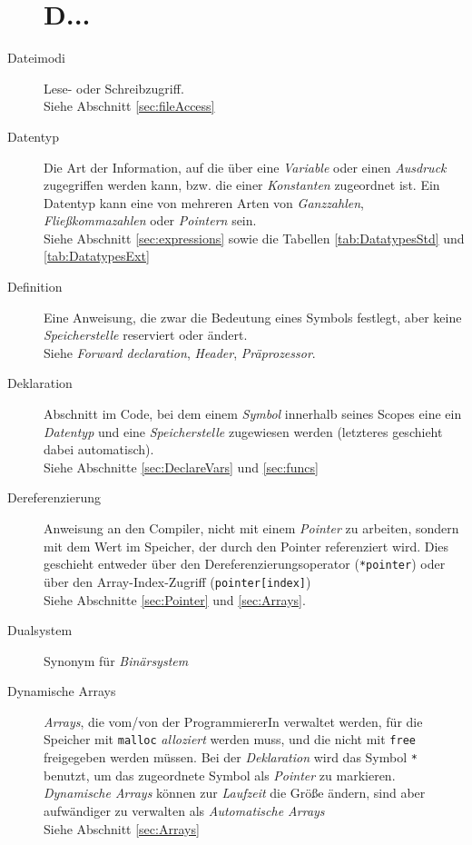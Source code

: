 \begin{appendices}
\begin{description}
\section*{D...}
\item[Dateimodi] Lese- oder Schreibzugriff.\\
	Siehe Abschnitt \ref{sec:fileAccess}
\item[Datentyp] Die Art der Information, auf die über eine \emph{Variable} oder einen \emph{Ausdruck} 
	zugegriffen werden kann, bzw. die einer \emph{Konstanten} zugeordnet ist. Ein Datentyp kann eine von
	mehreren Arten von \emph{Ganzzahlen}, \emph{Fließkommazahlen} oder \emph{Pointern} sein.\\
	Siehe Abschnitt \ref{sec:expressions} sowie die Tabellen \ref{tab:DatatypesStd} und
	\ref{tab:DatatypesExt}
\item[Definition] Eine Anweisung, die zwar die Bedeutung eines Symbols festlegt, aber keine
	\emph{Speicherstelle} reserviert oder ändert.\\
	Siehe \emph{Forward declaration}, \emph{Header}, \emph{Präprozessor}.
\item[Deklaration] Abschnitt im Code, bei dem einem \emph{Symbol} innerhalb seines Scopes eine
	ein \emph{Datentyp} und eine \emph{Speicherstelle} zugewiesen werden (letzteres geschieht dabei
	automatisch).\\
	Siehe Abschnitte \ref{sec:DeclareVars} und \ref{sec:funcs}
\item[Dereferenzierung] Anweisung an den Compiler, nicht mit einem \emph{Pointer} zu arbeiten, sondern
	mit dem Wert im Speicher, der durch den Pointer referenziert wird. Dies geschieht entweder über den
	Dereferenzierungsoperator (\texttt{*pointer}) oder über den Array-Index-Zugriff
	(\texttt{pointer[index]})\\
	Siehe Abschnitte \ref{sec:Pointer} und \ref{sec:Arrays}.
\item[Dualsystem] Synonym für \emph{Binärsystem}
\item[Dynamische Arrays] \emph{Arrays}, die vom/von der ProgrammiererIn verwaltet werden, \ie für die
	Speicher mit \texttt{malloc} \emph{alloziert} werden muss, und die nicht mit \texttt{free}
	freigegeben werden müssen. Bei der \emph{Deklaration} wird das Symbol \texttt{*} benutzt, um
	das zugeordnete Symbol als \emph{Pointer} zu markieren.\\
	\emph{Dynamische Arrays} können zur \emph{Laufzeit} die Größe ändern, sind aber aufwändiger zu
	verwalten als \emph{Automatische Arrays}\\
	Siehe Abschnitt \ref{sec:Arrays}


\end{description}
\end{appendices}
